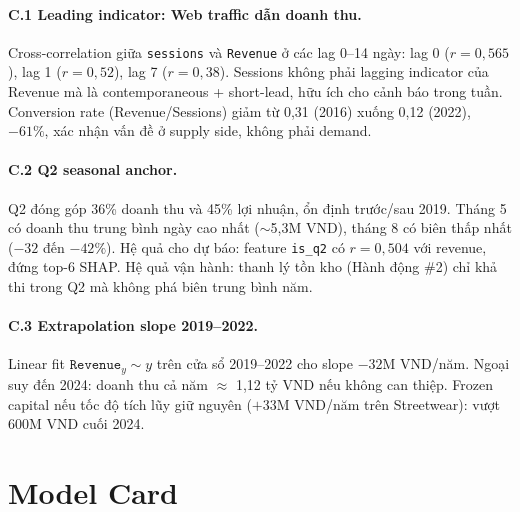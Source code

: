 \documentclass{article}
\begin{document}
\paragraph{C.1 Leading indicator: Web traffic dẫn doanh thu.}
Cross-correlation giữa \texttt{sessions} và \texttt{Revenue} ở các lag
0--14 ngày: lag 0 ($r=0,565$), lag 1 ($r=0,52$), lag 7 ($r=0,38$).
Sessions không phải lagging indicator của Revenue mà là contemporaneous
+ short-lead, hữu ích cho cảnh báo trong tuần. Conversion rate
(Revenue/Sessions) giảm từ 0,31 (2016) xuống 0,12 (2022), $-61\%$,
xác nhận vấn đề ở supply side, không phải demand.

\paragraph{C.2 Q2 seasonal anchor.}
Q2 đóng góp 36\% doanh thu và 45\% lợi nhuận, ổn định trước/sau 2019.
Tháng 5 có doanh thu trung bình ngày cao nhất ($\sim$5,3M VND),
tháng 8 có biên thấp nhất ($-32$ đến $-42\%$). Hệ quả cho dự báo: feature
\texttt{is\_q2} có $r=0,504$ với revenue, đứng top-6 SHAP. Hệ quả vận
hành: thanh lý tồn kho (Hành động \#2) chỉ khả thi trong Q2 mà không
phá biên trung bình năm.

\paragraph{C.3 Extrapolation slope 2019--2022.}
Linear fit $\texttt{Revenue}_y \sim y$ trên cửa sổ 2019--2022 cho
slope $-32$M VND/năm. Ngoại suy đến 2024: doanh thu cả năm $\approx$
1,12 tỷ VND nếu không can thiệp. Frozen capital nếu tốc độ tích lũy
giữ nguyên ($+$33M VND/năm trên Streetwear): vượt 600M VND cuối 2024.

\section{Model Card}
\label{app:model}
\end{document}
